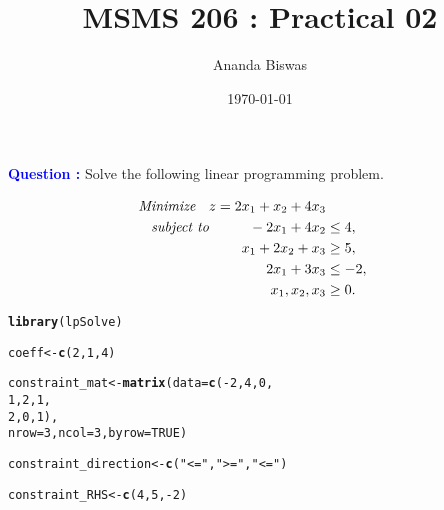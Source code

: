 \documentclass[11pt, a4paper]{article}\usepackage[]{graphicx}\usepackage[]{xcolor}
\title{MSMS 206 : Practical 02}
\author{Ananda Biswas}
\date{\today}
\makeatletter
\newcommand{\hlnum}[1]{\textcolor[rgb]{0.686,0.059,0.569}{#1}}%
\newcommand{\hlsng}[1]{\textcolor[rgb]{0.192,0.494,0.8}{#1}}%
\newcommand{\hlopt}[1]{\textcolor[rgb]{0,0,0}{#1}}%
\newcommand{\hldef}[1]{\textcolor[rgb]{0.345,0.345,0.345}{#1}}%
\newcommand{\hlkwb}[1]{\textcolor[rgb]{0.69,0.353,0.396}{#1}}%
\newcommand{\hlkwc}[1]{\textcolor[rgb]{0.333,0.667,0.333}{#1}}%
\newcommand{\hlkwd}[1]{\textcolor[rgb]{0.737,0.353,0.396}{\textbf{#1}}}%
\newenvironment{kframe}{%
 \def\at@end@of@kframe{}%
 \ifinner\ifhmode%
  \def\at@end@of@kframe{\end{minipage}}%
  \begin{minipage}{\columnwidth}%
 \fi\fi%
 \def\FrameCommand##1{\hskip\@totalleftmargin \hskip-\fboxsep
 \colorbox{shadecolor}{##1}\hskip-\fboxsep
     \hskip-\linewidth \hskip-\@totalleftmargin \hskip\columnwidth}%
 \MakeFramed {\advance\hsize-\width
   \@totalleftmargin\z@ \linewidth\hsize
   \@setminipage}}%
 {\par\unskip\endMakeFramed%
 \at@end@of@kframe}
\newenvironment{knitrout}{}{} %
\makeatother
\begin{document}
\maketitle


 \hspace{0.2cm} \textcolor{blue}{\textbf{Question :}} Solve the following linear programming problem.

\begin{align*}
\textit{Minimize \hspace{6pt}} z = 2x_1 + x_2 + 4x_3 \\
\textit{subject to \hspace{25pt}} -2x_1 + 4x_2 &\leq 4, \\
x_1 + 2x_2 + x_3 &\geq 5, \\
2x_1 + 3x_3 &\leq -2, \\
x_1, x_2, x_3 &\geq 0.
\end{align*}




\begin{knitrout}
\color{fgcolor}\begin{kframe}
\begin{alltt}
\hlkwd{library}\hldef{(lpSolve)}
\end{alltt}
\end{kframe}
\end{knitrout}

\begin{knitrout}
\color{fgcolor}\begin{kframe}
\begin{alltt}
\hldef{coeff} \hlkwb{<-} \hlkwd{c}\hldef{(}\hlnum{2}\hldef{,} \hlnum{1}\hldef{,} \hlnum{4}\hldef{)}

\hldef{constraint_mat} \hlkwb{<-} \hlkwd{matrix}\hldef{(}\hlkwc{data} \hldef{=} \hlkwd{c}\hldef{(}\hlopt{-}\hlnum{2}\hldef{,} \hlnum{4}\hldef{,} \hlnum{0}\hldef{,}
                                  \hlnum{1}\hldef{,} \hlnum{2}\hldef{,} \hlnum{1}\hldef{,}
                                  \hlnum{2}\hldef{,} \hlnum{0}\hldef{,} \hlnum{1}\hldef{),}
                         \hlkwc{nrow} \hldef{=} \hlnum{3}\hldef{,} \hlkwc{ncol} \hldef{=} \hlnum{3}\hldef{,} \hlkwc{byrow} \hldef{=} \hlnum{TRUE}\hldef{)}

\hldef{constraint_direction} \hlkwb{<-} \hlkwd{c}\hldef{(}\hlsng{"<="}\hldef{,} \hlsng{">="}\hldef{,} \hlsng{"<="}\hldef{)}

\hldef{constraint_RHS} \hlkwb{<-} \hlkwd{c}\hldef{(}\hlnum{4}\hldef{,} \hlnum{5}\hldef{,} \hlopt{-}\hlnum{2}\hldef{)}
\end{alltt}
\end{kframe}
\end{knitrout}
\end{document}
